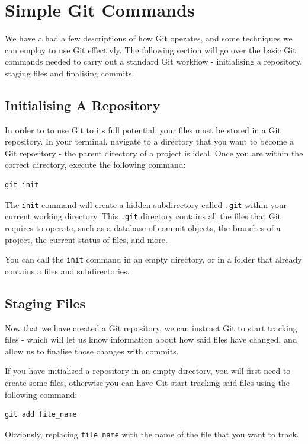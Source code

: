\documentclass[11pt, a4paper, titlepage]{article}
\begin{document}
\section{Simple Git Commands}
We have a had a few descriptions of how Git operates, and some techniques we
can employ to use Git effectivly.
The following section will go over the basic Git commands needed to carry out
a standard Git workflow - initialising a repository, staging files and
finalising commits.


\subsection{Initialising A Repository}
In order to to use Git to its full potential, your files must be stored in a
Git repository.
In your terminal, navigate to a directory that you want to become a Git
repository - the parent directory of a project is ideal.
Once you are within the correct directory, execute the following command:

\begin{lstlisting}[label=lst_init,
caption=Initialising a new Git repository]
 git init 
\end{lstlisting}

The {\tt init} command will create a hidden subdirectory called {\tt .git}
within your current working directory.
This {\tt .git} directory contains all the files that Git requires to
operate, such as a database of commit objects, the branches of a project, the
current status of files, and more.

You can call the {\tt init} command in an empty directory, or in a folder that
already contains a files and subdirectories.


\subsection{Staging Files}
Now that we have created a Git repository, we can instruct Git to start
tracking files - which will let us know information about how said files have
changed, and allow us to finalise those changes with commits. 

If you have initialised a repository in an empty directory, you will first
need to create some files, otherwise you can have Git start tracking said
files using the following command:

\begin{lstlisting}[label=lst_add_file,
caption=Adding a file to the Stagging area.]
 git add file_name
\end{lstlisting}
Obviously, replacing {\tt file\_name} with the name of the file that you want
to track.
\end{document}
